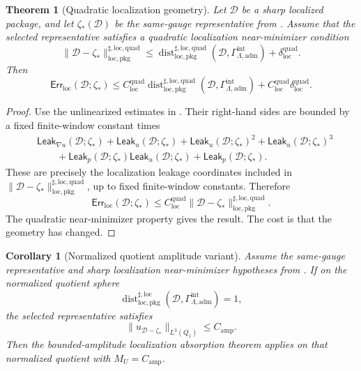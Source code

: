 \documentclass[11pt]{article}
\numberwithin{equation}{section}
\newtheorem{theorem}{Theorem}[section]
\newtheorem{corollary}[corollary]{Corollary}
\theoremstyle{definition}
\theoremstyle{remark}
\newcommand{\loc}{\mathrm{loc}}
\newcommand{\pkg}{\mathrm{pkg}}
\newcommand{\adm}{\mathrm{adm}}
\newcommand{\quadg}{\mathrm{quad}}
\newcommand{\Err}{\mathsf{Err}}
\newcommand{\Leak}{\mathsf{Leak}}
\newcommand{\Dist}{\operatorname{dist}}
\newcommand{\calD}{\mathcal D}
\newcommand{\Qone}{Q_1}
\newcommand{\Gadm}{\Gamma^{\mathrm{int}}_{\Lambda,\adm}}
\begin{document}
\begin{theorem}[Quadratic localization geometry]
\label{loc:thm:quadratic-localization-absorption}
Let \(\calD\) be a sharp localized package, and let \(\zeta_*(\calD)\) be the
same-gauge representative from .  Assume that the
selected representative satisfies a quadratic localization near-minimizer
condition
\[
    \|\calD-\zeta_*\|_{\loc,\pkg}^{\sharp,\loc,\quadg}
    \le
    \Dist_{\loc,\pkg}^{\sharp,\loc,\quadg}(\calD,\Gadm)
    +
    \delta_{\loc}^{\quadg}.
\]
Then
\[
    \Err_{\loc}(\calD;\zeta_*)
    \le
    C_{\loc}^{\quadg}
    \Dist_{\loc,\pkg}^{\sharp,\loc,\quadg}(\calD,\Gadm)
    +
    C_{\loc}^{\quadg}\delta_{\loc}^{\quadg}.
\]
\end{theorem}

\begin{proof}
Use the unlinearized estimates in
.  Their
right-hand sides are bounded by a fixed finite-window constant times
\[
\begin{aligned}
    &\Leak_{\nabla u}(\calD;\zeta_*)
    +
    \Leak_u(\calD;\zeta_*)
    +
    \Leak_u(\calD;\zeta_*)^2
    +
    \Leak_u(\calD;\zeta_*)^3
\\
    &\qquad+
    \Leak_p(\calD;\zeta_*)\Leak_u(\calD;\zeta_*)
    +
    \Leak_p(\calD;\zeta_*).
\end{aligned}
\]
These are precisely the localization leakage coordinates included in
\(\|\calD-\zeta_*\|_{\loc,\pkg}^{\sharp,\loc,\quadg}\), up to fixed
finite-window constants.  Therefore
\[
    \Err_{\loc}(\calD;\zeta_*)
    \le
    C_{\loc}^{\quadg}
    \|\calD-\zeta_*\|_{\loc,\pkg}^{\sharp,\loc,\quadg}.
\]
The quadratic near-minimizer property gives the result.  The cost is that the
geometry has changed.
\end{proof}

\begin{corollary}[Normalized quotient amplitude variant]
\label{loc:cor:normalized-quotient-amplitude}
Assume the same-gauge representative and sharp localization near-minimizer
hypotheses from .  If on
the normalized quotient sphere
\[
    \Dist_{\loc,\pkg}^{\sharp,\loc}(\calD,\Gadm)=1,
\]
the selected representative satisfies
\[
    \|u_{\calD-\zeta_*}\|_{L^3(\Qone)}
    \le
    C_{\mathrm{amp}}.
\]
Then the bounded-amplitude localization absorption theorem applies on that
normalized quotient with \(M_U=C_{\mathrm{amp}}\).
\end{corollary}
\end{document}
